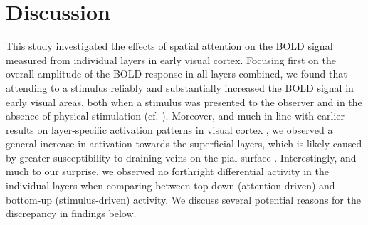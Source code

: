 \documentclass[9pt,lineno]{aperture}
\begin{document}
\begin{figure}
\label{figsupp:layerresultsinterp}

\end{figure}

\section{Discussion}
This study investigated the effects of spatial attention on the BOLD signal measured from individual layers in early visual cortex. Focusing first on the overall amplitude of the BOLD response in all layers combined, we found that attending to a stimulus reliably and substantially increased the BOLD signal in early visual areas, both when a stimulus was presented to the observer and in the absence of physical stimulation (cf. \citep{Kastner1999,Murray2008,Li2008}). Moreover, and much in line with earlier results on layer-specific activation patterns in visual cortex \citep{Koopmans2010,Polimeni2010}, we observed a general increase in activation towards the superficial layers, which is likely caused by greater susceptibility to draining veins on the pial surface \citep{Koopmans2011}. Interestingly, and much to our surprise, we observed no forthright differential activity in the individual layers when comparing between top-down (attention-driven) and bottom-up (stimulus-driven) activity. We discuss several potential reasons for the discrepancy in findings below.
\end{document}

